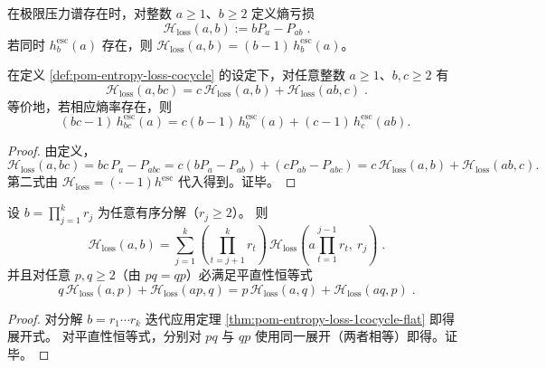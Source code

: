 \begin{definition}\label{def:pom-entropy-loss-cocycle}
在极限压力谱存在时，对整数 \(a\ge 1\)、\(b\ge 2\) 定义熵亏损
\[
\boxed{\;
\mathcal{H}_{\mathrm{loss}}(a,b):=bP_a-P_{ab}\; }.
\]
若同时 \(h^{\mathrm{esc}}_b(a)\) 存在，则
\(
\mathcal{H}_{\mathrm{loss}}(a,b)=(b-1)\,h^{\mathrm{esc}}_b(a)
\)。
\end{definition}

\begin{theorem}\label{thm:pom-entropy-loss-1cocycle-flat}
在定义 \ref{def:pom-entropy-loss-cocycle} 的设定下，对任意整数 \(a\ge 1\)、\(b,c\ge 2\) 有
\[
\boxed{\;
\mathcal{H}_{\mathrm{loss}}(a,bc)=c\,\mathcal{H}_{\mathrm{loss}}(a,b)+\mathcal{H}_{\mathrm{loss}}(ab,c)\; }.
\]
等价地，若相应熵率存在，则
\[
(bc-1)\,h^{\mathrm{esc}}_{bc}(a)=c(b-1)\,h^{\mathrm{esc}}_{b}(a)+(c-1)\,h^{\mathrm{esc}}_{c}(ab).
\]
\end{theorem}
\begin{proof}
由定义，
\[
\mathcal{H}_{\mathrm{loss}}(a,bc)
=bc\,P_a-P_{abc}
=c(bP_a-P_{ab})+(cP_{ab}-P_{abc})
=c\,\mathcal{H}_{\mathrm{loss}}(a,b)+\mathcal{H}_{\mathrm{loss}}(ab,c).
\]
第二式由 \(\mathcal{H}_{\mathrm{loss}}=(\cdot-1)h^{\mathrm{esc}}\) 代入得到。证毕。
\end{proof}

\begin{corollary}[沿任意因子链的展开与交换诱导的平直性条件]\label{cor:pom-entropy-loss-factor-chain-expansion}
设 \(b=\prod_{j=1}^{k} r_j\) 为任意有序分解（\(r_j\ge 2\)）。
则
\[
\boxed{\;
\mathcal{H}_{\mathrm{loss}}(a,b)
=
\sum_{j=1}^{k}\left(\prod_{t=j+1}^{k} r_t\right)\,
\mathcal{H}_{\mathrm{loss}}\!\left(a\prod_{t=1}^{j-1}r_t,\ r_j\right)\; }.
\]
并且对任意 \(p,q\ge 2\)（由 \(pq=qp\)）必满足平直性恒等式
\[
\boxed{\;
q\,\mathcal{H}_{\mathrm{loss}}(a,p)+\mathcal{H}_{\mathrm{loss}}(ap,q)
=
p\,\mathcal{H}_{\mathrm{loss}}(a,q)+\mathcal{H}_{\mathrm{loss}}(aq,p)\; }.
\]
\end{corollary}
\begin{proof}
对分解 \(b=r_1\cdots r_k\) 迭代应用定理 \ref{thm:pom-entropy-loss-1cocycle-flat} 即得展开式。
对平直性恒等式，分别对 \(pq\) 与 \(qp\) 使用同一展开（两者相等）即得。证毕。
\end{proof}

